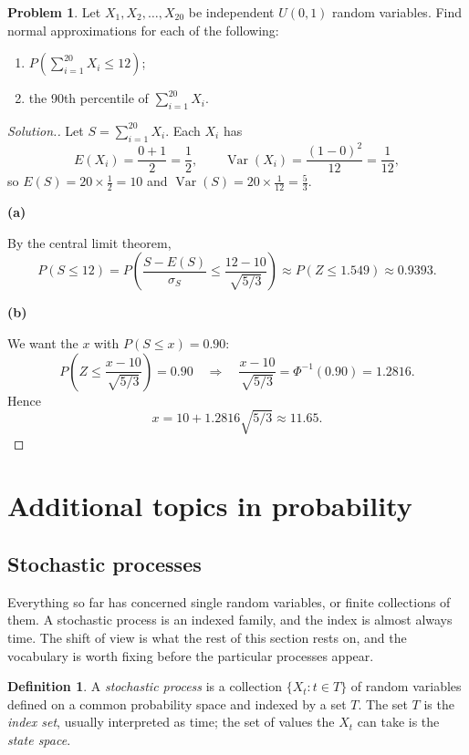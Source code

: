\documentclass[11pt,a4paper]{article}
\theoremstyle{definition}
\newtheorem{defn}[thm]{Definition}
\newtheorem{problemx}{Problem}[subsection]
\newenvironment{problem}{\begin{problemx}}{\end{problemx}}
\newenvironment{solution}
  {\renewcommand{\qedsymbol}{}\begin{proof}[\textit{Solution}.]}
  {\end{proof}}
\newcommand{\subhead}[1]{%
  \par\medskip\noindent\textbf{#1}\par\nobreak\smallskip}
\DeclareMathOperator{\Var}{Var}
\begin{document}
\begin{problem}
Let $X_1,X_2,\dots,X_{20}$ be independent $U(0,1)$ random variables. Find
normal approximations for each of the following:
\begin{enumerate}[label=(\alph*)]
\item $P\left(\sum_{i=1}^{20}X_i\leq12\right)$;
\item the 90th percentile of $\sum_{i=1}^{20}X_i$.
\end{enumerate}
\end{problem}
\begin{solution}
Let $S=\sum_{i=1}^{20}X_i$. Each $X_i$ has
$$E(X_i) = \frac{0+1}{2} = \frac12,\qquad
\Var(X_i) = \frac{(1-0)^{2}}{12} = \frac{1}{12},$$
so $E(S) = 20\times\frac12 = 10$ and $\Var(S) = 20\times\frac{1}{12} = \frac53$.

\subhead{(a)}
By the central limit theorem,
$$P(S\leq12) = P\left(\frac{S-E(S)}{\sigma_S}\leq\frac{12-10}{\sqrt{5/3}}\right)
\approx P(Z\leq1.549)\approx0.9393 .$$

\subhead{(b)}
We want the $x$ with $P(S\leq x) = 0.90$:
$$P\left(Z\leq\frac{x-10}{\sqrt{5/3}}\right) = 0.90
\quad\Longrightarrow\quad
\frac{x-10}{\sqrt{5/3}} = \Phi^{-1}(0.90) = 1.2816 .$$
Hence
$$x = 10+1.2816\sqrt{5/3}\approx11.65 .$$
\end{solution}


\section{Additional topics in probability}
\subsection{Stochastic processes}

Everything so far has concerned single random variables, or finite collections
of them. A stochastic process is an indexed family, and the index is almost
always time. The shift of view is what the rest of this section rests on, and
the vocabulary is worth fixing before the particular processes appear.

\begin{defn}
A \emph{stochastic process} is a collection $\{X_t : t\in T\}$ of random
variables defined on a common probability space and indexed by a set $T$. The
set $T$ is the \emph{index set}, usually interpreted as time; the set of values
the $X_t$ can take is the \emph{state space}.
\end{defn}
\end{document}
